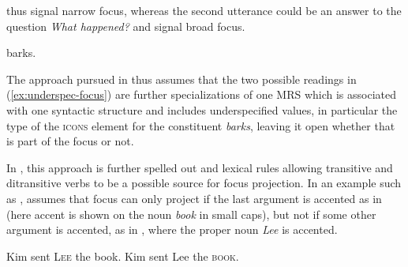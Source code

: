 \documentclass[output=paper]{langsci/langscibook}
\begin{document}
thus signal narrow focus, whereas the second utterance could be an answer
to the question \textit{What happened?} and signal broad focus.
\begin{exe}
  \ex\label{ex:underspec-focus}
  \begin{xlist}
     barks.
  \end{xlist}
\end{exe}
The approach pursued in \cite{song-bender:2012} thus assumes that the
two possible readings in (\ref{ex:underspec-focus}) are further
specializations of one MRS which is associated with one syntactic
structure and includes underspecified values, in particular the type
of the \textsc{icons} element for the constituent \textit{barks},
leaving it open whether that is part of the focus or not.

In \cite{song2018}, this approach is further spelled out and lexical
rules allowing transitive and ditransitive verbs to be a possible
source for focus projection. In an example such as
, \cite{song2018} assumes that focus can
only project if the last argument is accented as in
 (here accent is shown on the noun \textit{book} in
  small caps), but not if some other argument is accented, as in
  , where the proper noun \textit{Lee}
  is accented.

\begin{exe}
  \ex\label{ex:song-ditrans-focus}
  \begin{xlist}
    \ex Kim sent  \textsc{Lee} the book.\label{ex:song-ditrans-focus-a}
    \ex Kim sent Lee the \textsc{book}.\label{ex:song-ditrans-focus-b}
  \end{xlist}
\end{exe}
\end{document}
